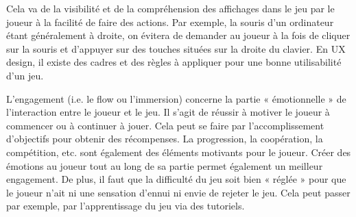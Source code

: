 \documentclass{article}
\begin{document}
		Cela va de la visibilité et de la compréhension des affichages dans le jeu par le joueur à la facilité de faire des actions.
		Par exemple, la souris d’un ordinateur étant généralement à droite, on évitera de demander au joueur à la fois de cliquer sur la souris et d’appuyer sur des touches situées sur la droite du clavier.
		En UX design, il existe des cadres et des règles à appliquer pour une bonne utilisabilité d’un jeu.\par
		L’engagement (i.e. le flow ou l’immersion) concerne la partie « émotionnelle » de l’interaction entre le joueur et le jeu.
		Il s’agit de réussir à motiver le joueur à commencer ou à continuer à jouer.
		Cela peut se faire par l’accomplissement d’objectifs pour obtenir des récompenses.
		La progression, la coopération, la compétition, etc. sont également des éléments motivants pour le joueur.
		Créer des émotions au joueur tout au long de sa partie permet également un meilleur engagement.
		De plus, il faut que la difficulté du jeu soit bien « réglée » pour que le joueur n’ait ni une sensation d’ennui ni envie de rejeter le jeu.
		Cela peut passer par exemple, par l’apprentissage du jeu via des tutoriels.
\end{document}
